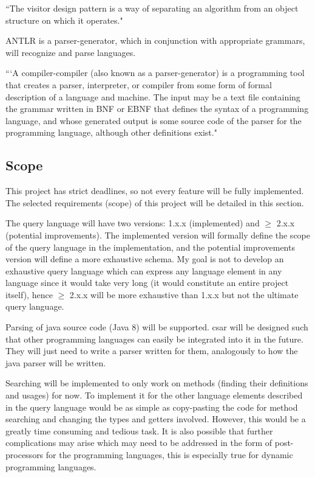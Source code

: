 \documentclass[12pt, letterpaper]{article}
\begin{document}
``The visitor design pattern is a way of separating an algorithm from an object structure on which it operates." \autocite{wikipediavisitorpattern}

ANTLR is a parser-generator, which in conjunction with appropriate grammars, will recognize and parse languages.

```A compiler-compiler (also known as a parser-generator) is a programming tool that creates a parser, interpreter, or compiler from some form of formal description of a language and machine. The input may be a text file containing the grammar written in BNF or EBNF that defines the syntax of a programming language, and whose generated output is some source code of the parser for the programming language, although other definitions exist." \autocite{wikipediacompilercompiler}

\subsection{Scope}
This project has strict deadlines, so not every feature will be fully implemented.
The selected requirements (scope) of this project will be detailed in this section.

The query language will have two versions: 1.x.x (implemented) and $ \geq $ 2.x.x (potential improvements).
The implemented version will formally define the scope of the query language in the implementation, and the potential improvements version will define a more exhaustive schema.
My goal is not to develop an exhaustive query language which can express any language element in any language since it would take very long (it would constitute an entire project itself), hence $ \geq $ 2.x.x will be more exhaustive than 1.x.x but not the ultimate query language.

Parsing of java source code (Java 8) will be supported.
csar will be designed such that other programming languages can easily be integrated into it in the future.
They will just need to write a parser written for them, analogously to how the java parser will be written.

Searching will be implemented to only work on methods (finding their definitions and usages) for now.
To implement it for the other language elements described in the query language would be as simple as copy-pasting the code for method searching and changing the types and getters involved.
However, this would be a greatly time consuming and tedious task.
It is also possible that further complications may arise which may need to be addressed in the form of post-processors for the programming languages, this is especially true for dynamic programming languages.
\end{document}
